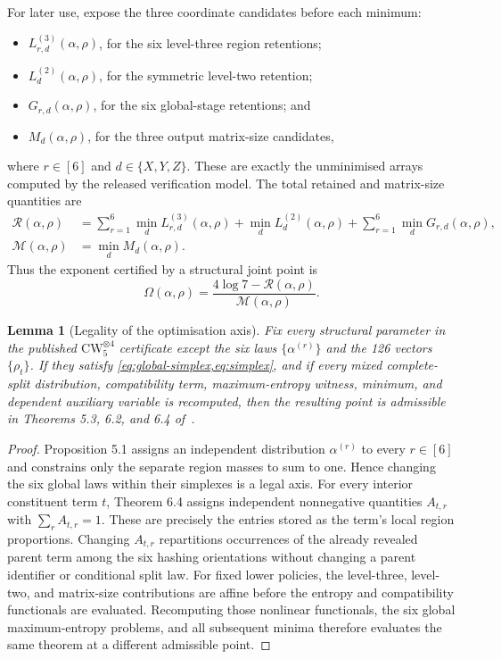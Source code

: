 \documentclass[11pt,reqno]{amsart}
\newtheorem{lemma}[theorem]{Lemma}
\theoremstyle{definition}
\theoremstyle{remark}
\newcommand{\CW}{\mathrm{CW}}
\begin{document}
For later use, expose the three coordinate candidates before each minimum:
\begin{itemize}[leftmargin=2em]
  \item $L^{(3)}_{r,d}(\alpha,\rho)$, for the six level-three region retentions;
  \item $L^{(2)}_d(\alpha,\rho)$, for the symmetric level-two retention;
  \item $G_{r,d}(\alpha,\rho)$, for the six global-stage retentions; and
  \item $M_d(\alpha,\rho)$, for the three output matrix-size candidates,
\end{itemize}
where $r\in[6]$ and $d\in\{X,Y,Z\}$.  These are exactly the unminimised arrays computed by the released
verification model.  The total retained and matrix-size quantities are
\begin{align}
 \mathcal R(\alpha,\rho)
  &=\sum_{r=1}^{6}\min_d L^{(3)}_{r,d}(\alpha,\rho)
    +\min_d L^{(2)}_d(\alpha,\rho)
    +\sum_{r=1}^{6}\min_d G_{r,d}(\alpha,\rho),\label{eq:retained}\\
 \mathcal M(\alpha,\rho)&=\min_d M_d(\alpha,\rho).\label{eq:matrix}
\end{align}
Thus the exponent certified by a structural joint point is
\begin{equation}\label{eq:omega-ratio}
  \Omega(\alpha,\rho)=\frac{4\log 7-\mathcal R(\alpha,\rho)}
  {\mathcal M(\alpha,\rho)}.
\end{equation}

\begin{lemma}[Legality of the optimisation axis]\label{lem:legal}
Fix every structural parameter in the published $\CW_5^{\otimes4}$ certificate except the six laws
$\{\alpha^{(r)}\}$ and the 126 vectors $\{\rho_t\}$.  If they satisfy
\cref{eq:global-simplex,eq:simplex}, and if every mixed complete-split distribution, compatibility term,
maximum-entropy witness, minimum, and dependent auxiliary variable is recomputed, then the resulting
point is admissible in Theorems 5.3, 6.2, and 6.4 of~\cite{MoreAsymmetry}.
\end{lemma}

\begin{proof}
Proposition 5.1 assigns an independent distribution $\alpha^{(r)}$ to every $r\in[6]$ and constrains
only the separate region masses to sum to one.  Hence changing the six global laws within their simplexes
is a legal axis.  For every interior constituent term $t$, Theorem 6.4 assigns independent nonnegative quantities
$A_{t,r}$ with $\sum_r A_{t,r}=1$.  These are precisely the entries stored as the term's local region
proportions.  Changing $A_{t,r}$ repartitions occurrences of the already revealed parent term among the
six hashing orientations without changing a parent identifier or conditional split law.  For fixed lower
policies, the level-three, level-two, and matrix-size contributions are affine before the entropy and
compatibility functionals are evaluated.  Recomputing those nonlinear functionals, the six global
maximum-entropy problems, and all subsequent minima therefore evaluates the same theorem at a different
admissible point.
\end{proof}
\end{document}
